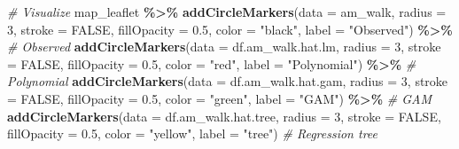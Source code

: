 \documentclass[
]{book}
\newenvironment{Shaded}{\begin{snugshade}}{\end{snugshade}}
\newcommand{\AttributeTok}[1]{\textcolor[rgb]{0.13,0.29,0.53}{#1}}
\newcommand{\CommentTok}[1]{\textcolor[rgb]{0.56,0.35,0.01}{\textit{#1}}}
\newcommand{\ConstantTok}[1]{\textcolor[rgb]{0.56,0.35,0.01}{#1}}
\newcommand{\DecValTok}[1]{\textcolor[rgb]{0.00,0.00,0.81}{#1}}
\newcommand{\FloatTok}[1]{\textcolor[rgb]{0.00,0.00,0.81}{#1}}
\newcommand{\FunctionTok}[1]{\textcolor[rgb]{0.13,0.29,0.53}{\textbf{#1}}}
\newcommand{\NormalTok}[1]{#1}
\newcommand{\SpecialCharTok}[1]{\textcolor[rgb]{0.81,0.36,0.00}{\textbf{#1}}}
\newcommand{\StringTok}[1]{\textcolor[rgb]{0.31,0.60,0.02}{#1}}
\begin{document}
\begin{Shaded}
\begin{Highlighting}[]
\CommentTok{\# Visualize}
\NormalTok{map\_leaflet }\SpecialCharTok{\%\textgreater{}\%}
  \FunctionTok{addCircleMarkers}\NormalTok{(}\AttributeTok{data =}\NormalTok{ am\_walk, }
                   \AttributeTok{radius =} \DecValTok{3}\NormalTok{, }\AttributeTok{stroke =} \ConstantTok{FALSE}\NormalTok{, }\AttributeTok{fillOpacity =} \FloatTok{0.5}\NormalTok{,}
                   \AttributeTok{color =} \StringTok{"black"}\NormalTok{, }\AttributeTok{label =} \StringTok{"Observed"}\NormalTok{) }\SpecialCharTok{\%\textgreater{}\%} \CommentTok{\# Observed}
  \FunctionTok{addCircleMarkers}\NormalTok{(}\AttributeTok{data =}\NormalTok{ df.am\_walk.hat.lm, }
                   \AttributeTok{radius =} \DecValTok{3}\NormalTok{, }\AttributeTok{stroke =} \ConstantTok{FALSE}\NormalTok{, }\AttributeTok{fillOpacity =} \FloatTok{0.5}\NormalTok{,}
                   \AttributeTok{color =} \StringTok{"red"}\NormalTok{, }\AttributeTok{label =} \StringTok{"Polynomial"}\NormalTok{) }\SpecialCharTok{\%\textgreater{}\%} \CommentTok{\# Polynomial }
  \FunctionTok{addCircleMarkers}\NormalTok{(}\AttributeTok{data =}\NormalTok{ df.am\_walk.hat.gam,}
                   \AttributeTok{radius =} \DecValTok{3}\NormalTok{, }\AttributeTok{stroke =} \ConstantTok{FALSE}\NormalTok{, }\AttributeTok{fillOpacity =} \FloatTok{0.5}\NormalTok{,}
                   \AttributeTok{color =} \StringTok{"green"}\NormalTok{, }\AttributeTok{label =} \StringTok{"GAM"}\NormalTok{) }\SpecialCharTok{\%\textgreater{}\%} \CommentTok{\# GAM}
  \FunctionTok{addCircleMarkers}\NormalTok{(}\AttributeTok{data =}\NormalTok{ df.am\_walk.hat.tree,}
                   \AttributeTok{radius =} \DecValTok{3}\NormalTok{, }\AttributeTok{stroke =} \ConstantTok{FALSE}\NormalTok{, }\AttributeTok{fillOpacity =} \FloatTok{0.5}\NormalTok{,}
                   \AttributeTok{color =} \StringTok{"yellow"}\NormalTok{, }\AttributeTok{label =} \StringTok{"tree"}\NormalTok{) }\CommentTok{\# Regression tree}
\end{Highlighting}
\end{Shaded}
\end{document}
